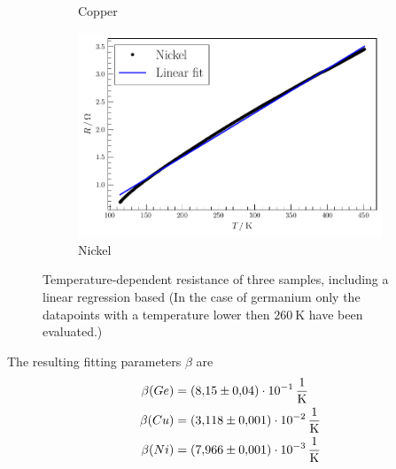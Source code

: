 \begin{figure}
\begin{subfigure}{.3\textwidth}
    \caption{Copper}
    \label{fig:Cu}
\end{subfigure}
\begin{subfigure}{.3\textwidth}
    \centering
    \includegraphics[width=\textwidth]{plots/R3.pdf}
  \caption{Nickel}
    \label{fig:Ni}
\end{subfigure}
\caption{Temperature-dependent resistance of three samples, including a linear regression based (In the case of germanium only the datapoints with a temperature lower then $\SI{260}{\kelvin}$ have been evaluated.)}
\label{fig:metalic-fit}
\end{figure}

The resulting fitting parameters $\beta$ are
\begin{align*}
    \beta(Ge) &= \SI{8.15 \pm 0.04 e-1}{\per\kelvin} \\
    \beta(Cu) &= \SI{3.118 \pm 0.001 e-2}{\per\kelvin} \\
    \beta(Ni) &= \SI{7.966 \pm 0.001 e-3}{\per\kelvin} \\
\end{align*}
